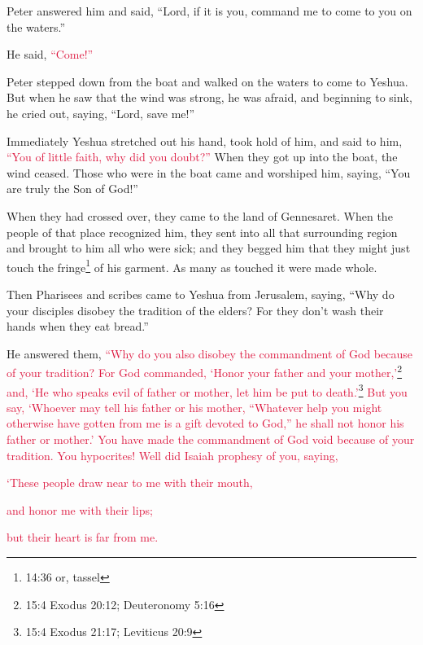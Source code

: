 \myverse{}Peter answered him and said, “Lord, if it is you, command me
to come to you on the waters.”

\myverse{}He said,
\textcolor{crimson}{“Come!”}

Peter stepped down from the boat and walked on the waters to come to Yeshua.
\myverse{}But when he saw that the wind was strong, he was afraid, and beginning to
sink, he cried out, saying, “Lord, save me!”

\myverse{}Immediately Yeshua stretched out his hand, took hold of him,
and said to him,
\textcolor{crimson}{“You of little faith, why did you doubt?”}
\myverse{}When they got up into the boat, the wind ceased.
\myverse{}Those who were in the boat came and worshiped him, saying, “You are truly
the Son of God!”

\myverse{}When they had crossed over, they came to the land of Gennesaret.
\myverse{}When the people of that place recognized him, they sent into all that surrounding
region and brought to him all who were sick;
\myverse{}and they begged him that they might just touch the fringe\footnote{14:36 or, tassel} of his garment. As many as touched it were made whole.


\mychapter{} \myverse*{}Then Pharisees and scribes came to Yeshua from Jerusalem, saying,
\myverse{}“Why do your disciples disobey the tradition of the elders? For they don’t
wash their hands when they eat bread.”

\myverse{}He answered them,
\textcolor{crimson}{“Why do you also disobey the commandment of God because of your tradition?
}
\myverse{}\textcolor{crimson}{For God commanded, ‘Honor your father and your mother,’}\footnote{15:4 Exodus 20:12;
	Deuteronomy 5:16}
\textcolor{crimson}{and, ‘He who speaks evil of father or mother, let him be put to death.’}\footnote{15:4 Exodus 21:17;
	Leviticus 20:9}
\myverse{}\textcolor{crimson}{But you say, ‘Whoever may tell his father or his mother, “Whatever help
	you might otherwise have gotten from me is a gift devoted to God,”
}
\myverse{}\textcolor{crimson}{he shall not honor his father or mother.’ You have made the commandment
	of God void because of your tradition.
}
\myverse{}\textcolor{crimson}{You hypocrites! Well did Isaiah prophesy of you, saying,}

\myverse{}\textcolor{crimson}{‘These people draw near to me with their mouth,}

\textcolor{crimson}{and honor me with their lips;}

\textcolor{crimson}{but their heart is far from me.}

